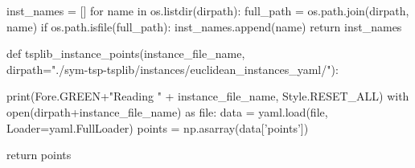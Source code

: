      inst_names = []
     for name in os.listdir(dirpath):
         full_path = os.path.join(dirpath, name)
         if os.path.isfile(full_path):
             inst_names.append(name)
     return inst_names

def tsplib_instance_points(instance_file_name,\\
                           dirpath="./sym-tsp-tsplib/instances/euclidean_instances_yaml/"):

        print(Fore.GREEN+"Reading " + instance_file_name, Style.RESET_ALL)
        with open(dirpath+instance_file_name) as file:
            data = yaml.load(file, Loader=yaml.FullLoader)
            points = np.asarray(data['points'])
        
        return points 
           
\nwendcode{}\nwdocspar


